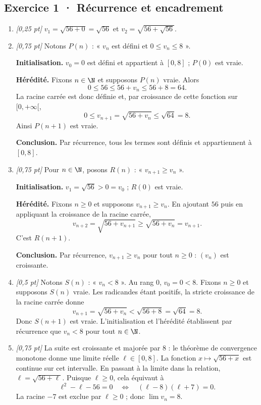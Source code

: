 \subsection*{Exercice 1 · Récurrence et encadrement}\begin{enumerate}

\item \textit{[0,25 pt]} $v_1=\sqrt{56+0}=\sqrt{56}$ et $v_2=\sqrt{56+\sqrt{56}}$.

\item \textit{[0,75 pt]} Notons $P(n)$ : « $v_n$ est défini et $0\le v_n\le 8$ ».
\par\smallskip\textbf{Initialisation.} $v_0=0$ est défini et appartient à $[0,8]$ ; $P(0)$ est vraie.
\par\smallskip\textbf{Hérédité.} Fixons $n\in\N$ et supposons $P(n)$ vraie. Alors
\[0\le 56\le 56+v_n\le 56+8=64.\]
La racine carrée est donc définie et, par croissance de cette fonction sur $[0,+\infty[$,
\[0\le v_{n+1}=\sqrt{56+v_n}\le\sqrt{64}=8.\]
Ainsi $P(n+1)$ est vraie.
\par\smallskip\textbf{Conclusion.} Par récurrence, tous les termes sont définis et appartiennent à $[0,8]$.

\item \textit{[0,75 pt]} Pour $n\in\N$, posons $R(n)$ : « $v_{n+1}\ge v_n$ ».
\par\smallskip\textbf{Initialisation.} $v_1=\sqrt{56}>0=v_0$ ; $R(0)$ est vraie.
\par\smallskip\textbf{Hérédité.} Fixons $n\ge0$ et supposons $v_{n+1}\ge v_n$. En ajoutant $56$ puis en appliquant la croissance de la racine carrée,
\[v_{n+2}=\sqrt{56+v_{n+1}}\ge\sqrt{56+v_n}=v_{n+1}.\]
C'est $R(n+1)$.
\par\smallskip\textbf{Conclusion.} Par récurrence, $v_{n+1}\ge v_n$ pour tout $n\ge0$ : $(v_n)$ est croissante.

\item \textit{[0,5 pt]} Notons $S(n)$ : « $v_n<8$ ». Au rang $0$, $v_0=0<8$.
Fixons $n\ge0$ et supposons $S(n)$ vraie. Les radicandes étant positifs, la stricte croissance de la racine carrée donne
\[v_{n+1}=\sqrt{56+v_n}<\sqrt{56+8}=\sqrt{64}=8.\]
Donc $S(n+1)$ est vraie. L'initialisation et l'hérédité établissent par récurrence que $v_n<8$ pour tout $n\in\N$.

\item \textit{[0,75 pt]} La suite est croissante et majorée par $8$ : le théorème de convergence monotone donne une limite réelle $\ell\in[0,8]$.
La fonction $x\mapsto\sqrt{56+x}$ est continue sur cet intervalle. En passant à la limite dans la relation, $\ell=\sqrt{56+\ell}$. Puisque $\ell\ge0$, cela équivaut à
\[\ell^2-\ell-56=0\quad\Longleftrightarrow\quad(\ell-8)(\ell+7)=0.\]
La racine $-7$ est exclue par $\ell\ge0$ ; donc $\lim v_n=8$.


\end{enumerate}
